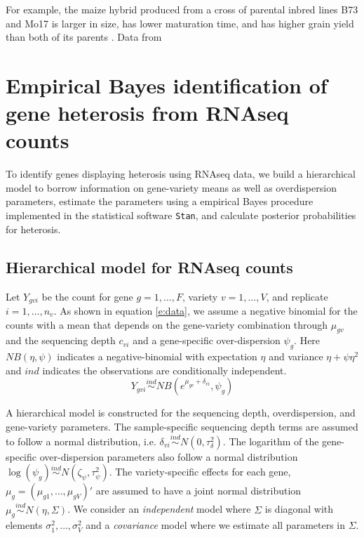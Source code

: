 \documentclass[useAMS,usenatbib,referee]{biom}
\begin{document}
For example, the maize hybrid produced from a cross of parental inbred lines B73 and Mo17 is larger in size, has lower maturation time, and has higher grain yield than both of its parents \cite{hallauer2010quantitative}. Data from \citep{paschold2012complementation}

\citep{ji2014estimation}


\section{Empirical Bayes identification of gene heterosis from RNAseq counts}

To identify genes displaying heterosis using RNAseq data, we build a hierarchical model to borrow information on gene-variety means as well as overdispersion parameters, estimate the parameters using a empirical Bayes procedure implemented in the statistical software {\tt Stan}, and calculate posterior probabilities for heterosis. 

\subsection{Hierarchical model for RNAseq counts}
\label{s:model}

Let $Y_{gvi}$ be the count for gene $g=1,\ldots,F$, variety $v=1,\ldots,V$, and replicate $i=1,\ldots,n_v$. As shown in equation \eqref{e:data}, we assume a negative binomial for the counts with a mean that depends on the gene-variety combination through $\mu_{gv}$ and the sequencing depth $c_{vi}$ and a gene-specific over-dispersion $\psi_g$. Here $NB(\eta,\psi)$ indicates a negative-binomial with expectation $\eta$ and variance $\eta+\psi\eta^2$ and $ind$ indicates the observations are conditionally independent.
\begin{equation} 
Y_{gvi} \stackrel{ind}{\sim} NB(e^{\mu_{gv}+\delta_{vi}},\psi_g) 
\label{e:data}
\end{equation}

A hierarchical model is constructed for the sequencing depth, overdispersion, and gene-variety parameters. The sample-specific sequencing depth terms are assumed to follow a normal distribution, i.e. $\delta_{vi} \stackrel{ind}{\sim} N(0,\tau_\delta^2)$. The logarithm of the gene-specific over-dispersion parameters also follow a normal distribution $\log(\psi_g) \stackrel{ind}{\sim} N(\zeta_\psi,\tau_\psi^2)$. The variety-specific effects for each gene, $\mu_g = (\mu_{g1},\ldots,\mu_{gV})'$ are assumed to have a joint normal distribution $\mu_g \stackrel{ind}{\sim} N(\eta, \Sigma)$. We consider an \emph{independent} model where $\Sigma$ is diagonal with elements $\sigma_1^2,\ldots,\sigma_V^2$ and a \emph{covariance} model where we estimate all parameters in $\Sigma$. 
\end{document}
